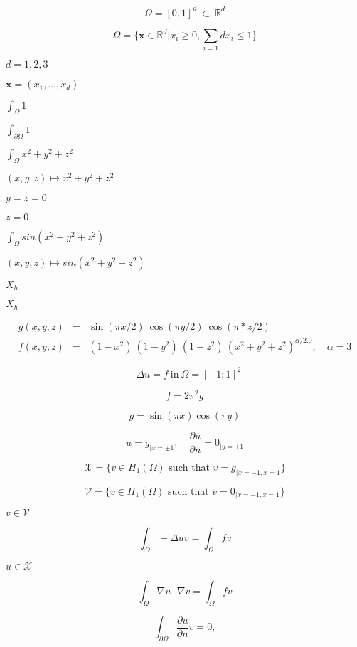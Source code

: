 \documentclass{article}
\begin{document}
\[ \Omega=[0,1]^d\ \subset\ \mathbb{R}^d \]
\pagebreak

\[ \Omega=\{ \mathbf{x} \in \mathbb{R}^d | x_i \geq 0, \sum_{i=1}{d} x_i \leq 1 \} \]
\pagebreak

$ d=1,2,3 $
\pagebreak

$ \mathbf{x}=(x_1,...,x_d) $
\pagebreak

$ \int_\Omega 1 $
\pagebreak

$ \int_{\partial\Omega} 1 $
\pagebreak

$ \int_{\Omega} x^2+y^2+z^2 $
\pagebreak

$ (x,y,z) \mapsto x^2+y^2+z^2$
\pagebreak

$y=z=0$
\pagebreak

$ z=0 $
\pagebreak

$ \int_{\Omega} sin(x^2+y^2+z^2) $
\pagebreak

$ (x,y,z) \mapsto sin(x^2+y^2+z^2)$
\pagebreak

$ X_h $
\pagebreak

$ X_h$
\pagebreak

\begin{eqnarray} g(x,y,z) &=& \sin(\pi x/2)\ \cos(\pi y/2)\ \cos(\pi*z/2) \\ f(x,y,z) &=& (1-x^2)\ (1-y^2)\ (1-z^2)\ (x^2+y^2+z^2)^{\alpha/2.0},\quad \alpha=3 \end{eqnarray}
\pagebreak

\[ -\Delta u = f\ \text{in}\ \Omega = [-1;1]^2 \]
\pagebreak

\[ f= 2 \pi^2 g \]
\pagebreak

\[ g=\sin(\pi x) \cos(\pi y) \]
\pagebreak

\[ u=g_{|x=\pm 1}, \quad \frac{\partial u}{\partial n} = 0_{|y=\pm 1} \]
\pagebreak

\[ \mathcal{X} = \Big\{ v \in H_1(\Omega) \text{ such that } v=g_{|x=-1,x=1} \Big\} \]
\pagebreak

\[ \mathcal{V} = \Big\{ v \in H_1(\Omega) \text{ such that } v=0_{|x=-1,x=1} \Big\} \]
\pagebreak

$v \in \mathcal{V}$
\pagebreak

\begin{equation} \label{eq:13} \int_\Omega -\Delta u v = \int_\Omega f v \end{equation}
\pagebreak

$u \in \mathcal{X}$
\pagebreak

\[ \int_\Omega \nabla u \cdot \nabla v = \int_\Omega f v \]
\pagebreak

\[ \int_{\partial \Omega} \frac{\partial u}{\partial n} v = 0, \]
\pagebreak
\end{document}
